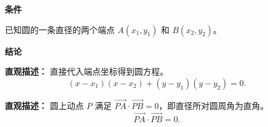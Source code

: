 \begin{statementbox}
	\textbf{\textcolor{CStatement}{条件}}
	\begin{description}[style=nextline, leftmargin=2.8em, labelsep=0.5em, itemsep=0.35em]
		\item[\textbf{\textcolor{CStatement}{条件1（直径端点已知）：}}] 已知圆的一条直径的两个端点 $A(x_1,y_1)$ 和 $B(x_2,y_2)$。
	\end{description}

	\textbf{\textcolor{CStatement}{结论}}
	\begin{description}[style=nextline, leftmargin=2.8em, labelsep=0.5em, itemsep=0.45em]
		\item[\textbf{\textcolor{CStatement}{结论一（方程形式）：}}]
			\textbf{\textcolor{CStatement}{直观描述：}}
			直接代入端点坐标得到圆方程。
			\[
				(x-x_1)(x-x_2)+(y-y_1)(y-y_2)=0.
			\]

		\item[\textbf{\textcolor{CStatement}{推广结论（向量等价）：}}]
			\textbf{\textcolor{CStatement}{直观描述：}}
			圆上动点 $P$ 满足 $\overrightarrow{PA}\cdot\overrightarrow{PB}=0$，即直径所对圆周角为直角。
			\[
				\overrightarrow{PA}\cdot\overrightarrow{PB}=0.
			\]
	\end{description}
\end{statementbox}
